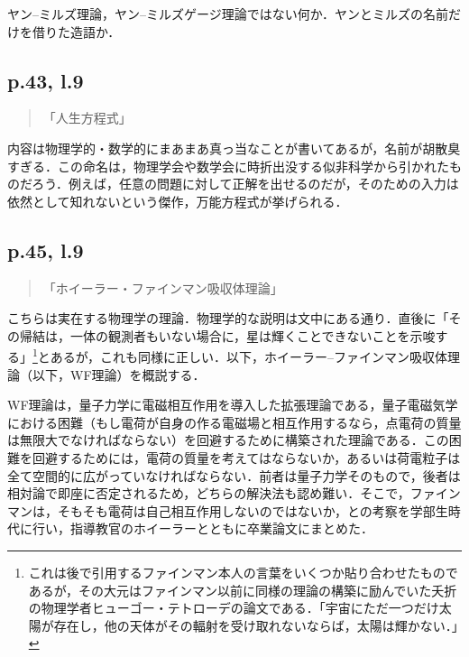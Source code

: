 \documentclass[10pt, a5paper, twoside]{jsarticle}
\theoremstyle{definition}
\begin{document}
			ヤン--ミルズ理論，ヤン--ミルズゲージ理論ではない何か．ヤンとミルズの名前だけを借りた造語か．

		

		\subsection{p.43, l.9}

			\begin{quote}
				
				「人生方程式」

			\end{quote}

			内容は物理学的・数学的にまあまあ真っ当なことが書いてあるが，名前が胡散臭すぎる．この命名は，物理学会や数学会に時折出没する似非科学から引かれたものだろう．例えば，任意の問題に対して正解を出せるのだが，そのための入力は依然として知れないという傑作，万能方程式が挙げられる\cite{irmn}．


		\subsection{p.45, l.9}

			\begin{quote}

				「ホイーラー・ファインマン吸収体理論」
				
			\end{quote}

			こちらは実在する物理学の理論．物理学的な説明は文中にある通り．直後に「その帰結は，一体の観測者もいない場合に，星は輝くことできないことを示唆する」\footnote{これは後で引用するファインマン本人の言葉をいくつか貼り合わせたものであるが，その大元はファインマン以前に同様の理論の構築に励んでいた夭折の物理学者ヒューゴー・テトローデの論文である．「宇宙にただ一つだけ太陽が存在し，他の天体がその輻射を受け取れないならば，太陽は輝かない．」\cite{tet}}とあるが，これも同様に正しい．以下，ホイーラー--ファインマン吸収体理論（以下，WF理論）を概説する．

			WF理論は，量子力学に電磁相互作用を導入した拡張理論である，量子電磁気学における困難（もし電荷が自身の作る電磁場と相互作用するなら，点電荷の質量は無限大でなければならない）を回避するために構築された理論である．この困難を回避するためには，電荷の質量を考えてはならないか，あるいは荷電粒子は全て空間的に広がっていなければならない．前者は量子力学そのもので，後者は相対論で即座に否定されるため，どちらの解決法も認め難い．そこで，ファインマンは，そもそも電荷は自己相互作用しないのではないか，との考察を学部生時代に行い，指導教官のホイーラーとともに卒業論文にまとめた．
\end{document}
